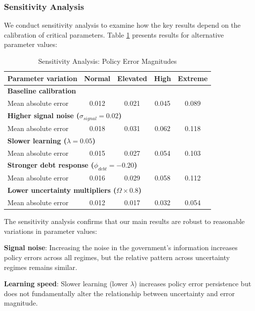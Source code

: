 \documentclass[5p,authoryear]{elsarticle}
\begin{document}
\subsubsection{Sensitivity Analysis}

We conduct sensitivity analysis to examine how the key results depend on the calibration of critical parameters. Table \ref{tab:sensitivity} presents results for alternative parameter values:

\begin{table}[h!]
\centering
\caption{Sensitivity Analysis: Policy Error Magnitudes}
\label{tab:sensitivity}
\begin{tabular}{lcccc}
\toprule
Parameter variation & Normal & Elevated & High & Extreme \\
\midrule
\multicolumn{5}{l}{\textbf{Baseline calibration}} \\
Mean absolute error & 0.012 & 0.021 & 0.045 & 0.089 \\
\midrule
\multicolumn{5}{l}{\textbf{Higher signal noise ($\sigma_{signal} = 0.02$)}} \\
Mean absolute error & 0.018 & 0.031 & 0.062 & 0.118 \\
\midrule
\multicolumn{5}{l}{\textbf{Slower learning ($\lambda = 0.05$)}} \\
Mean absolute error & 0.015 & 0.027 & 0.054 & 0.103 \\
\midrule
\multicolumn{5}{l}{\textbf{Stronger debt response ($\phi_{debt} = -0.20$)}} \\
Mean absolute error & 0.016 & 0.029 & 0.058 & 0.112 \\
\midrule
\multicolumn{5}{l}{\textbf{Lower uncertainty multipliers ($\Omega \times 0.8$)}} \\
Mean absolute error & 0.012 & 0.017 & 0.032 & 0.054 \\
\bottomrule
\end{tabular}
\end{table}

The sensitivity analysis confirms that our main results are robust to reasonable variations in parameter values:

\textbf{Signal noise}: Increasing the noise in the government's information increases policy errors across all regimes, but the relative pattern across uncertainty regimes remains similar.

\textbf{Learning speed}: Slower learning (lower $\lambda$) increases policy error persistence but does not fundamentally alter the relationship between uncertainty and error magnitude.
\end{document}
